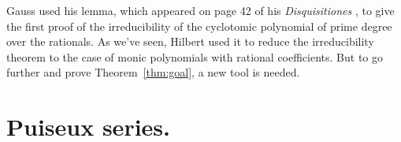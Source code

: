 \documentclass{article}
\theoremstyle{plain}
\theoremstyle{definition}
\begin{document}
%
%
%
%
Gauss used his lemma, which appeared on page 42 of his \emph{Disquisitiones} \cite{Gauss}, to give the first proof of the irreducibility of the cyclotomic polynomial of prime degree over the rationals.  As we've seen, Hilbert used it to reduce the irreducibility theorem to the case of monic polynomials with rational coefficients.  
But to go further and prove Theorem~\ref{thm:goal}, a new tool is needed.



\section{Puiseux series.}
\label{sec:pseries}

%
%
%
%
%
\end{document}
